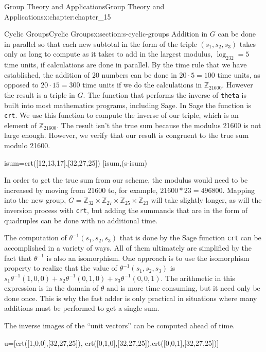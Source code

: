 \documentclass[twoside,10pt,]{book}
\newcommand{\mono}[1]{\texttt{#1}}
\numberwithin{equation}{section}
\begin{document}
\begin{chapterptx}{Group Theory and Applications}{}{Group Theory and Applications}{}{}{x:chapter:chapter_15}
\begin{sectionptx}{Cyclic Groups}{}{Cyclic Groups}{}{}{x:section:s-cyclic-groups}
Addition in \(G\) can be done in parallel so that each new subtotal in the form of the triple \((s_1,s_2, s_3)\)  takes only as long to compute as it takes to add in the largest modulus, \(\log _232=5\) time units, if calculations are done in parallel. By the time rule that we have established, the addition of 20 numbers can be done in \(20\cdot 5= 100\) time units, as opposed to \(20\cdot 15 =300\) time units if we do the calculations in \(\mathbb{Z}_{21600}\).  However the result is a triple in \(G\).  The function that performs the inverse of \mono{theta} is built into most mathematics programs, including Sage.  In Sage the function is \mono{crt}.  We use this function to compute the inverse of our triple, which is an element of \(\mathbb{Z}_{21600}\).   The result isn't the true sum because the modulus 21600 is not large enough.  However, we verify that our result is congruent to the true sum modulo 21600.%
\begin{sageinput}
isum=crt([12,13,17],[32,27,25])
[isum,(s-isum)%
\end{sageinput}
\begin{sageoutput}
[2092, 0]
\end{sageoutput}
In order to get the true sum from our scheme, the modulus would need to be increased by moving from 21600 to, for example,  \(21600*23=496800\).  Mapping into the new group, \(G=\mathbb{Z}_{32}\times \mathbb{Z}_{27}\times \mathbb{Z}_{25}\times \mathbb{Z}_{23}\) will take slightly longer, as will the inversion process with \mono{crt}, but adding the summands that are in the form of quadruples can be done with no additional time.%
\par
The computation of \(\theta^{-1}\left(s_1,s_2,s_3\right)\) that is done by the Sage function \mono{crt} can be accomplished in a variety of ways. All of them ultimately are simplified by the fact that \(\theta^{-1}\) is also an isomorphism. One approach is to use the isomorphism property to realize that the value of \(\theta^{-1}\left(s_1,s_2,s_3\right)\) is \(s_1\theta^{-1}(1,0,0)+s_2\theta^{-1}(0,1,0)+s_3\theta^{-1}(0,0,1)\). The arithmetic in this expression is in the domain of \(\theta\) and is more time consuming, but it need only be done once. This is why the fast adder is only practical in situations where many additions must be performed to get a single sum.%
\par
The inverse images of the ``unit vectors'' can be computed ahead of time.%
\begin{sageinput}
u=[crt([1,0,0],[32,27,25]),
   crt([0,1,0],[32,27,25]),crt([0,0,1],[32,27,25])]

\end{sageinput}
\end{sectionptx}
\end{chapterptx}
\end{document}

